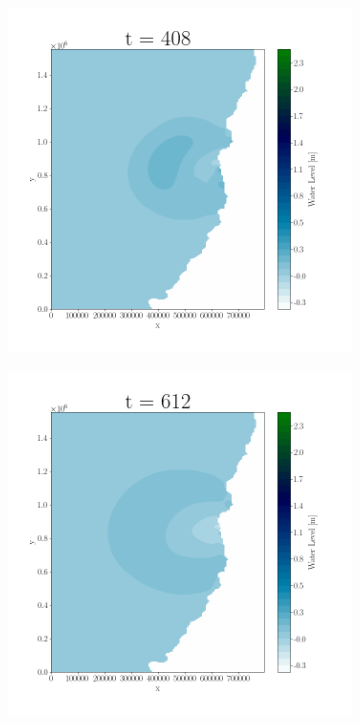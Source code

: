 \begin{figure}[H]
\begin{subfigure}[b]{.4\linewidth}
\includegraphics[width=\linewidth]{Figures/3-3.png}
\caption{}
\end{subfigure}
\begin{subfigure}[b]{.4\linewidth}
\includegraphics[width=\linewidth]{Figures/3-4.png}
\caption{}
\end{subfigure}


\end{figure}
